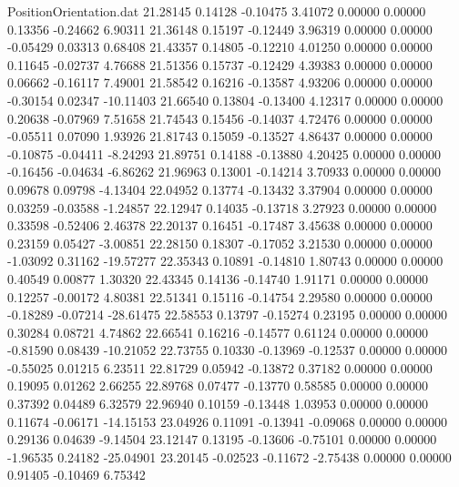 \begin{filecontents}{PositionOrientation.dat}
  21.28145    0.14128   -0.10475     3.41072    0.00000    0.00000    0.13356   -0.24662    6.90311
  21.36148    0.15197   -0.12449     3.96319    0.00000    0.00000   -0.05429    0.03313    0.68408
  21.43357    0.14805   -0.12210     4.01250    0.00000    0.00000    0.11645   -0.02737    4.76688
  21.51356    0.15737   -0.12429     4.39383    0.00000    0.00000    0.06662   -0.16117    7.49001
  21.58542    0.16216   -0.13587     4.93206    0.00000    0.00000   -0.30154    0.02347  -10.11403
  21.66540    0.13804   -0.13400     4.12317    0.00000    0.00000    0.20638   -0.07969    7.51658
  21.74543    0.15456   -0.14037     4.72476    0.00000    0.00000   -0.05511    0.07090    1.93926
  21.81743    0.15059   -0.13527     4.86437    0.00000    0.00000   -0.10875   -0.04411   -8.24293
  21.89751    0.14188   -0.13880     4.20425    0.00000    0.00000   -0.16456   -0.04634   -6.86262
  21.96963    0.13001   -0.14214     3.70933    0.00000    0.00000    0.09678    0.09798   -4.13404
  22.04952    0.13774   -0.13432     3.37904    0.00000    0.00000    0.03259   -0.03588   -1.24857
  22.12947    0.14035   -0.13718     3.27923    0.00000    0.00000    0.33598   -0.52406    2.46378
  22.20137    0.16451   -0.17487     3.45638    0.00000    0.00000    0.23159    0.05427   -3.00851
  22.28150    0.18307   -0.17052     3.21530    0.00000    0.00000   -1.03092    0.31162  -19.57277
  22.35343    0.10891   -0.14810     1.80743    0.00000    0.00000    0.40549    0.00877    1.30320
  22.43345    0.14136   -0.14740     1.91171    0.00000    0.00000    0.12257   -0.00172    4.80381
  22.51341    0.15116   -0.14754     2.29580    0.00000    0.00000   -0.18289   -0.07214  -28.61475
  22.58553    0.13797   -0.15274     0.23195    0.00000    0.00000    0.30284    0.08721    4.74862
  22.66541    0.16216   -0.14577     0.61124    0.00000    0.00000   -0.81590    0.08439  -10.21052
  22.73755    0.10330   -0.13969    -0.12537    0.00000    0.00000   -0.55025    0.01215    6.23511
  22.81729    0.05942   -0.13872     0.37182    0.00000    0.00000    0.19095    0.01262    2.66255
  22.89768    0.07477   -0.13770     0.58585    0.00000    0.00000    0.37392    0.04489    6.32579
  22.96940    0.10159   -0.13448     1.03953    0.00000    0.00000    0.11674   -0.06171  -14.15153
  23.04926    0.11091   -0.13941    -0.09068    0.00000    0.00000    0.29136    0.04639   -9.14504
  23.12147    0.13195   -0.13606    -0.75101    0.00000    0.00000   -1.96535    0.24182  -25.04901
  23.20145   -0.02523   -0.11672    -2.75438    0.00000    0.00000    0.91405   -0.10469    6.75342

\end{filecontents}
